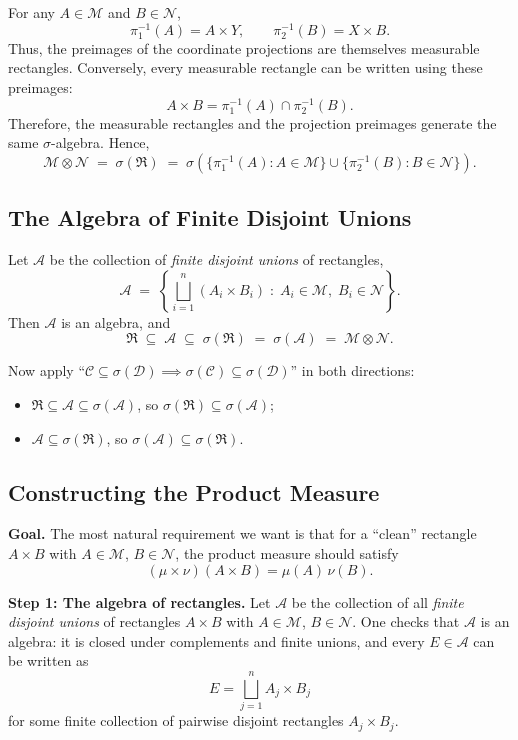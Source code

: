 \documentclass[11pt]{article}
\theoremstyle{definition}
\theoremstyle{plain}
\newcommand{\M}{\mathcal{M}}
\newcommand{\N}{\mathcal{N}}
\newcommand{\A}{\mathcal{A}}
\newcommand{\Rect}{\mathfrak{R}}
\begin{document}
For any $A \in \M$ and $B \in \N$,
\[
  \pi_1^{-1}(A) = A \times Y, \qquad \pi_2^{-1}(B) = X \times B.
\]
Thus, the preimages of the coordinate projections are themselves
measurable rectangles. Conversely, every measurable rectangle can be
written using these preimages:
\[
  A \times B = \pi_1^{-1}(A) \cap \pi_2^{-1}(B).
\]
Therefore, the measurable rectangles and the projection preimages
generate the same $\sigma$-algebra. Hence,
\[
  \boxed{\;\M \otimes \N \;=\; \sigma(\Rect)
    \;=\; \sigma\left( \{\pi_1^{-1}(A) : A \in \M\}
      \cup \{\pi_2^{-1}(B) : B \in \N\} \right).\;}
\]

\subsection{The Algebra of Finite Disjoint Unions}

Let $\A$ be the collection of \emph{finite disjoint unions} of
rectangles,
\[
  \A \;=\; \left\{ \bigsqcup_{i=1}^{n} (A_i \times B_i)
    \;:\; A_i \in \M, \; B_i \in \N \right\}.
\]
Then $\A$ is an algebra, and
\[
  \Rect \;\subseteq\; \A \;\subseteq\; \sigma(\Rect)
    \;=\; \sigma(\A) \;=\; \M \otimes \N.
\]

Now apply ``$\mathcal{C} \subseteq \sigma(\mathcal{D}) \implies
\sigma(\mathcal{C}) \subseteq \sigma(\mathcal{D})$'' in both directions:
\begin{itemize}
  \item $\Rect \subseteq \A \subseteq \sigma(\A)$, so
        $\sigma(\Rect) \subseteq \sigma(\A)$;
  \item $\A \subseteq \sigma(\Rect)$, so
        $\sigma(\A) \subseteq \sigma(\Rect)$.
\end{itemize}

\subsection{Constructing the Product Measure}

\noindent
\textbf{Goal.} The most natural requirement we want is that for a
``clean'' rectangle $A \times B$ with $A \in \M$, $B \in \N$, the
product measure should satisfy
\[
  (\mu \times \nu)(A \times B) = \mu(A)\,\nu(B).
\]

\medskip
\noindent
\textbf{Step 1: The algebra of rectangles.} Let $\A$ be the collection
of all \emph{finite disjoint unions} of rectangles $A \times B$ with
$A \in \M$, $B \in \N$. One checks that $\A$ is an algebra: it is
closed under complements and finite unions, and every $E \in \A$ can be
written as
\[
  E = \bigsqcup_{j=1}^{n} A_j \times B_j
\]
for some finite collection of pairwise disjoint rectangles
$A_j \times B_j$.
\end{document}
